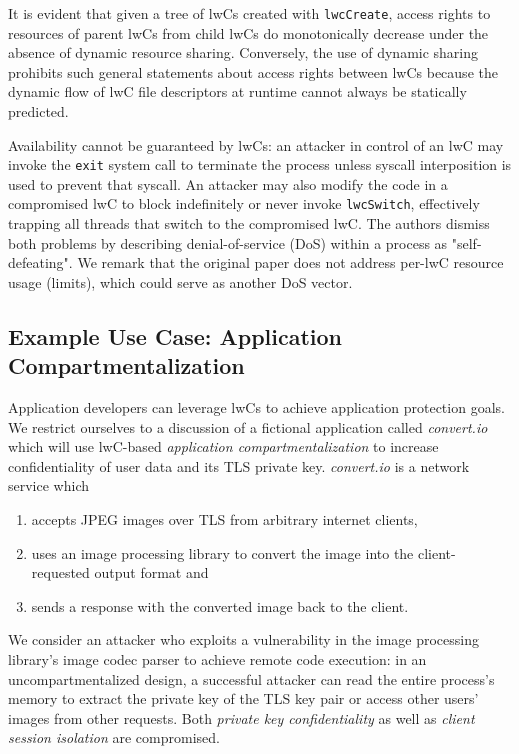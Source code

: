 \documentclass[10pt,twocolumn,letter]{article}
\begin{document}
It is evident that given a tree of lwCs created with \lstinline{lwcCreate}, access rights to resources of parent lwCs from child lwCs do monotonically decrease under the absence of dynamic resource sharing.
Conversely, the use of dynamic sharing prohibits such general statements about access rights between lwCs because the dynamic flow of lwC file descriptors at runtime cannot always be statically predicted.

Availability cannot be guaranteed by lwCs:
an attacker in control of an lwC may invoke the \lstinline{exit} system call to terminate the process unless syscall interposition is used to prevent that syscall.
An attacker may also modify the code in a compromised lwC to block indefinitely or never invoke \lstinline{lwcSwitch}, effectively trapping all threads that switch to the compromised lwC.
The authors dismiss both problems by describing denial-of-service (DoS) within a process as "self-defeating".
We remark that the original paper does not address per-lwC resource usage (limits), which could serve as another DoS vector. 


\subsection{Example Use Case: Application Compartmentalization}\label{design:usage}

Application developers can leverage lwCs to achieve application protection goals.
We restrict ourselves to a discussion of a fictional application called \newcommand\appname{\textit{convert.io}\xspace} \appname which will use lwC-based \textit{application compartmentalization} to increase confidentiality of user data and its TLS private key. 
\appname is a network service which
\begin{enumerate}
  \item accepts JPEG images over TLS from arbitrary internet clients,
  \item uses an image processing library to convert the image into the client-requested output format and
  \item sends a response with the converted image back to the client.
\end{enumerate}

We consider an attacker who exploits a vulnerability in the image processing library's image codec parser to achieve remote code execution:
in an uncompartmentalized design, a successful attacker can read the entire process's memory to extract the private key of the TLS key pair or access other users' images from other requests.
Both \textit{private key confidentiality} as well as \textit{client session isolation} are compromised.
\end{document}
